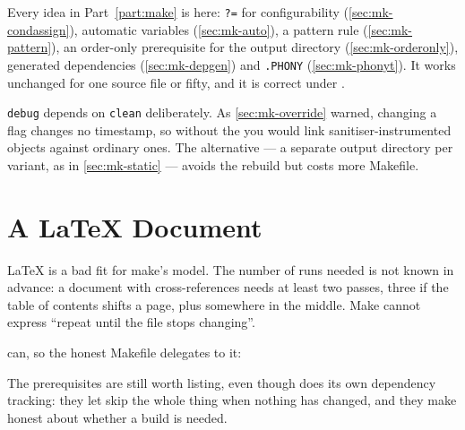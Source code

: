 \begin{note}
	Every idea in Part~\ref{part:make} is here: \texttt{?=} for configurability
	(\autoref{sec:mk-condassign}), automatic variables
	(\autoref{sec:mk-auto}), a pattern rule (\autoref{sec:mk-pattern}), an
	order-only prerequisite for the output directory
	(\autoref{sec:mk-orderonly}), generated dependencies
	(\autoref{sec:mk-depgen}) and \texttt{.PHONY}
	(\autoref{sec:mk-phonyt}). It works unchanged for one source file or fifty,
	and it is correct under .
\end{note}

\begin{note}
	\texttt{debug} depends on \texttt{clean} deliberately. As
	\autoref{sec:mk-override} warned, changing a flag changes no timestamp, so
	without the  you would link sanitiser-instrumented objects against
	ordinary ones. The alternative --- a separate output directory per variant, as
	in \autoref{sec:mk-static} --- avoids the rebuild but costs more Makefile.
\end{note}

\section{A \texorpdfstring{\LaTeX{}}{LaTeX} Document}\label{sec:mk-latex}

\LaTeX{} is a bad fit for make's model. The number of runs needed is not known
in advance: a document with cross-references needs at least two passes, three if
the table of contents shifts a page, plus  somewhere in the middle.
Make cannot express ``repeat until the  file stops changing''.

 can, so the honest Makefile delegates to it:


\begin{note}
	The prerequisites are still worth listing, even though  does its
	own dependency tracking: they let  skip the whole thing when nothing
	has changed, and they make  honest about whether a build is
	needed.
\end{note}

